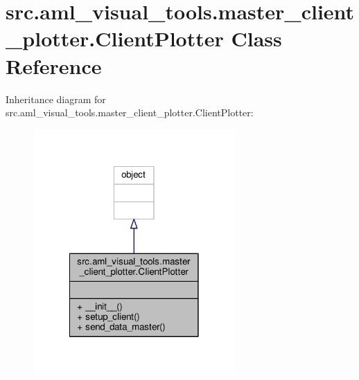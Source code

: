 \hypertarget{classsrc_1_1aml__visual__tools_1_1master__client__plotter_1_1_client_plotter}{\section{src.\-aml\-\_\-visual\-\_\-tools.\-master\-\_\-client\-\_\-plotter.\-Client\-Plotter Class Reference}
\label{classsrc_1_1aml__visual__tools_1_1master__client__plotter_1_1_client_plotter}
}


Inheritance diagram for src.\-aml\-\_\-visual\-\_\-tools.\-master\-\_\-client\-\_\-plotter.\-Client\-Plotter\-:
\nopagebreak
\begin{figure}[H]
\begin{center}
\leavevmode
\includegraphics[width=218pt]{classsrc_1_1aml__visual__tools_1_1master__client__plotter_1_1_client_plotter__inherit__graph}
\end{center}
\end{figure}


